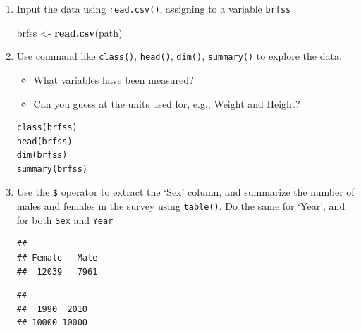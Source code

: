 \documentclass[]{article}
\newenvironment{Shaded}{\begin{snugshade}}{\end{snugshade}}
\newcommand{\KeywordTok}[1]{\textcolor[rgb]{0.13,0.29,0.53}{\textbf{#1}}}
\newcommand{\StringTok}[1]{\textcolor[rgb]{0.31,0.60,0.02}{#1}}
\newcommand{\OperatorTok}[1]{\textcolor[rgb]{0.81,0.36,0.00}{\textbf{#1}}}
\newcommand{\NormalTok}[1]{#1}
\theoremstyle{definition}
\theoremstyle{definition}
\theoremstyle{remark}
\begin{document}
\begin{enumerate}
\def\labelenumi{\arabic{enumi}.}
\setcounter{enumi}{1}
\item
  Input the data using \texttt{read.csv()}, assigning to a variable
  \texttt{brfss}

\begin{Shaded}
\begin{Highlighting}[]
\NormalTok{brfss <-}\StringTok{ }\KeywordTok{read.csv}\NormalTok{(path)}
\end{Highlighting}
\end{Shaded}
\item
  Use command like \texttt{class()}, \texttt{head()}, \texttt{dim()},
  \texttt{summary()} to explore the data.

  \begin{itemize}
  \item
    What variables have been measured?
  \item
    Can you guess at the units used for, e.g., Weight and Height?
  \end{itemize}

\begin{verbatim}
class(brfss)
head(brfss)
dim(brfss)
summary(brfss)
\end{verbatim}
\item
  Use the \texttt{\$} operator to extract the `Sex' column, and
  summarize the number of males and females in the survey using
  \texttt{table()}. Do the same for `Year', and for both \texttt{Sex}
  and \texttt{Year}

\begin{Shaded}
\end{Shaded}

\begin{verbatim}
## 
## Female   Male 
##  12039   7961
\end{verbatim}

\begin{Shaded}
\end{Shaded}

\begin{verbatim}
## 
##  1990  2010 
## 10000 10000
\end{verbatim}


\end{enumerate}
\end{document}
